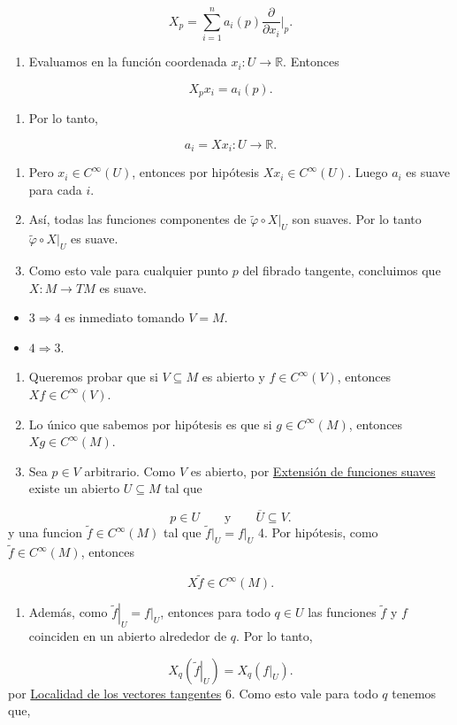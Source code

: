 \begin{bookproof}{}
\[
X_p=\sum_{i=1}^n a_i(p)\frac{\partial}{\partial x_i}\bigg|_p.
\]
\begin{enumerate}[start=8]
\item Evaluamos en la función coordenada $x_i:U\to\mathbb R$. Entonces
\end{enumerate}
\[
X_px_i=a_i(p).
\]
\begin{enumerate}[start=9]
\item Por lo tanto,
\end{enumerate}
\[
a_i=Xx_i:U\to\mathbb R.
\]
\begin{enumerate}[start=10]
\item Pero $x_i\in C^\infty(U)$, entonces por hipótesis $Xx_i\in C^\infty(U)$. Luego $a_i$ es suave para cada $i$.
\item Así, todas las funciones componentes de $\widetilde\varphi\circ X|_U$ son suaves. Por lo tanto $\widetilde\varphi\circ X|_U$ es suave.
\item Como esto vale para cualquier punto $p$ del fibrado tangente, concluimos que $X:M\to TM$ es suave.
\end{enumerate}
\begin{itemize}
\item $3 \Rightarrow 4$ es inmediato tomando $V=M$.
\item $4 \Rightarrow 3$.
\end{itemize}
\begin{enumerate}
\item Queremos probar que si $V\subseteq M$ es abierto y $f\in C^\infty(V)$, entonces $Xf\in C^\infty(V)$.
\item Lo único que sabemos por hipótesis es que si $g\in C^\infty(M)$, entonces $Xg\in C^\infty(M)$.
\item Sea $p\in V$ arbitrario. Como $V$ es abierto, por \hyperref[blk:405b16]{Extensión de funciones suaves} existe un abierto $U\subseteq M$ tal que
\end{enumerate}
\[
p\in U \qquad \text{y} \qquad \overline{U}\subseteq V.
\]
y una funcion $\widetilde f\in C^\infty(M)$ tal que $\widetilde f|_{ U}=\left.f\right|_{ U}$ 4. Por hipótesis, como $\widetilde f\in C^\infty(M)$, entonces

\[
X\widetilde f\in C^\infty(M).
\]
\begin{enumerate}[start=5]
\item Además, como $\left.\widetilde f\right|_U=\left.f\right|_U$, entonces para todo $q\in U$ las funciones $\widetilde f$ y $f$ coinciden en un abierto alrededor de $q$. Por lo tanto,
\end{enumerate}
\[
X_q\left(\left.\widetilde f\right|_U\right)=X_q\left(\left.f\right|_U\right).
\]
por \hyperref[blk:b713ca]{Localidad de los vectores tangentes} 6. Como esto vale para todo $q$ tenemos que,


\end{bookproof}
